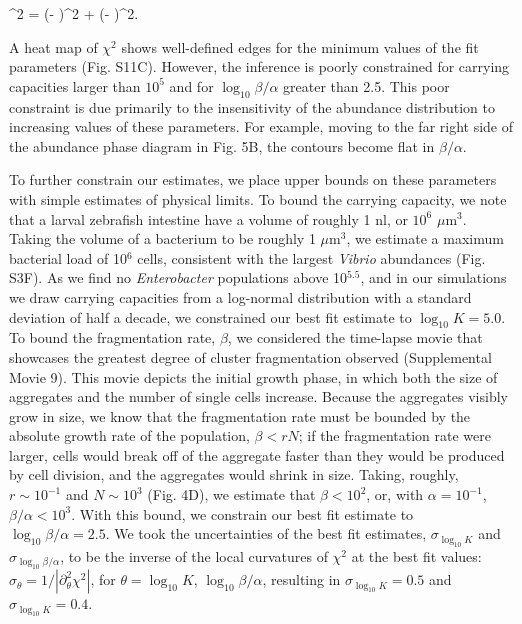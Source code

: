 \be
\chi^2 = (\mu - \hat{\mu})^2 + (\sigma - \hat{\sigma})^2.
\ee

A heat map of $\chi^2$ shows well-defined edges for the minimum values of the fit parameters (Fig. S11C). However, the inference is poorly constrained for carrying capacities larger than $10^5$ and for $\log_{10} \beta/\alpha$  greater than 2.5. This poor constraint is due primarily to the insensitivity of the abundance distribution to increasing values of these parameters. For example, moving to the far right side of the abundance phase diagram in Fig. 5B, the contours become flat in $\beta/\alpha$. 

To further constrain our estimates, we place upper bounds on these parameters with simple estimates of physical limits. To bound the carrying capacity, we note that a larval zebrafish intestine have a volume of roughly 1 nl, or $10^6$ $\mu$m$^3$. Taking the volume of a bacterium to be roughly 1 $\mu$m$^3$, we estimate a maximum bacterial load of 10$^6$ cells, consistent with the largest \textit{Vibrio} abundances (Fig. S3F). As we find no \textit{Enterobacter} populations above 10$^{5.5}$, and in our simulations we draw carrying capacities from a log-normal distribution with a standard deviation of half a decade, we constrained our best fit estimate to $\log_{10}K = 5.0$. To bound the fragmentation rate, $\beta$, we considered the time-lapse movie that showcases the greatest degree of cluster fragmentation observed (Supplemental Movie 9). This movie depicts the initial growth phase, in which both the size of aggregates and the number of single cells increase. Because the aggregates visibly grow in size, we know that the fragmentation rate must be bounded by the absolute growth rate of the population, $\beta < rN$; if the fragmentation rate were larger, cells would break off of the aggregate faster than they would be produced by cell division, and the aggregates would shrink in size. Taking, roughly, $r\sim 10^{-1}$ and $N\sim 10^3$ (Fig. 4D), we estimate that $\beta < 10^2$, or, with $\alpha = 10^{-1}$, $\beta/\alpha < 10^3$. With this bound, we constrain our best fit estimate to $\log_{10}\beta/\alpha = 2.5$. We took the uncertainties of the best fit estimates, $\sigma_{\log_{10}K}$ and $\sigma_{\log_{10}\beta/\alpha}$, to be the inverse of the local curvatures of $\chi^2$ at the best fit values: $\sigma_{\theta} = 1/|\partial^2_{\theta}\chi^2|$, for $\theta = \log_{10}K$, $\log_{10}\beta/\alpha$, resulting in $\sigma_{\log_{10}K} = 0.5$ and $\sigma_{\log_{10}K} = 0.4$.

